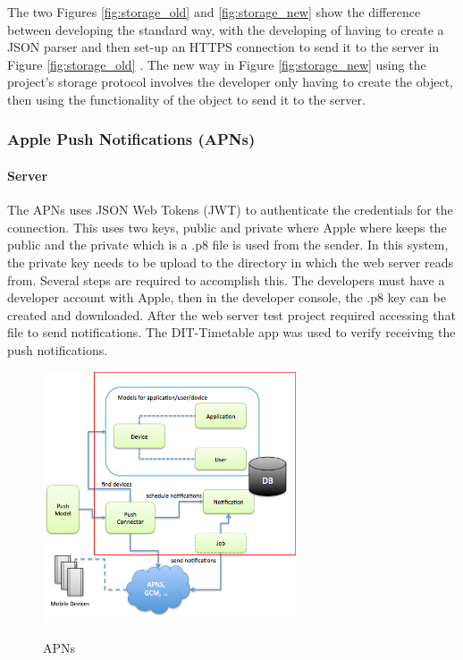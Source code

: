 The two Figures \ref{fig:storage_old} and \ref{fig:storage_new} show the difference between developing the standard way, with the developing of having to create a JSON parser and then set-up an HTTPS connection to send it to the server in Figure \ref{fig:storage_old} . The new way in Figure \ref{fig:storage_new} using the project’s storage protocol involves the developer only having to create the object, then using the functionality of the object to send it to the server.

\subsubsection{Apple Push Notifications (APNs)}

\paragraph{Server}
The APNs uses JSON Web Tokens (JWT) to authenticate the credentials for the connection. This uses two keys, public and private where Apple where keeps the public and the private which is a .p8 file is used from the sender. In this system, the private key needs to be upload to the directory in which the web server reads from.  Several steps are required to accomplish this. The developers must have a developer account with Apple, then in the developer console, the .p8 key can be created and downloaded. After the web server test project required accessing that file to send notifications. The DIT-Timetable app was used to verify receiving the push notifications.

\begin{figure}[!h]
    \caption{APNs \cite{apns}}
    \centering
    \includegraphics[width=75mm]{images/APNs}
    \label{fig:apns_overview}
\end{figure}

